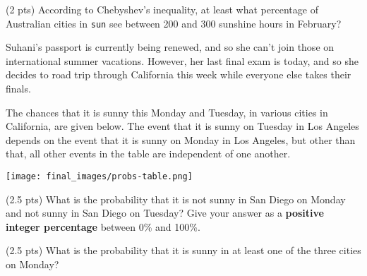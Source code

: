 \begin{prob}[(10 pts)]
\begin{subprobset}

\begin{subprob}(2 pts) According to Chebyshev's inequality, at least what percentage of Australian cities in \texttt{sun} see between 200 and 300 sunshine hours in February?



\end{subprob}
  
\end{subprobset}

\end{prob}

\newpage

\begin{prob}[(12 pts)]

Suhani's passport is currently being renewed, and so she can't join those on international summer vacations. However, her last final exam is today, and so she decides to road trip through California this week while everyone else takes their finals.

The chances that it is sunny this Monday and Tuesday, in various cities in California, are given below. The event that it is sunny on Tuesday in Los Angeles depends on the event that it is sunny on Monday in Los Angeles, but other than that, all other events in the table are independent of one another.

\begin{center}
\texttt{[image: final\_images/probs-table.png]}
\end{center}

\begin{subprobset}

\begin{subprob}(2.5 pts) What is the probability that it is not sunny in San Diego on Monday and not sunny in San Diego on Tuesday? Give your answer as a \textbf{positive integer percentage} between 0\% and 100\%.

\inlineresponsebox[2in]{}{}

\end{subprob}

\begin{subprob}(2.5 pts) What is the probability that it is sunny in at least one of the three cities on Monday?



\end{subprob}
\end{subprobset}
\end{prob}
